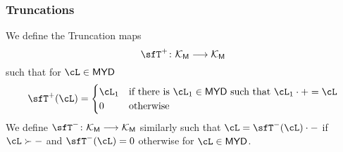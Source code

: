 \documentclass[12pt,a4paper]{amsart}
\def\MYD{{\mathsf{MYD}}}
\def\KM{{\mathcal{K_{\mathsf{M}}}}}
\numberwithin{equation}{section}
\theoremstyle{remark}
\def\ssign{\mathrm{Sign}}
\begin{document}



\subsubsection{Truncations}%

\def\Tpp{\sfT^+}
\def\Tmm{\sfT^-}
\def\Tpm{\sfT^{\pm}}

We define the Truncation maps %
\[
  \Tpp \colon \KM\longrightarrow \KM
\]
such that for $\cL\in \MYD$
\[
\Tpp(\cL) = \begin{cases}
  \cL_{1} & \text{if there is $\cL_{1}\in \MYD$ such that $\cL_{1}\cdot + = \cL $}\\
  0 & \text{otherwise}
\end{cases}
\]
We define $\Tmm\colon \KM \longrightarrow \KM$ similarly such that
$\cL=\Tmm(\cL)\cdot - $ if $\cL\succ -$ and $\Tmm(\cL)=0$
otherwise for $\cL\in \MYD$.
\end{document}
